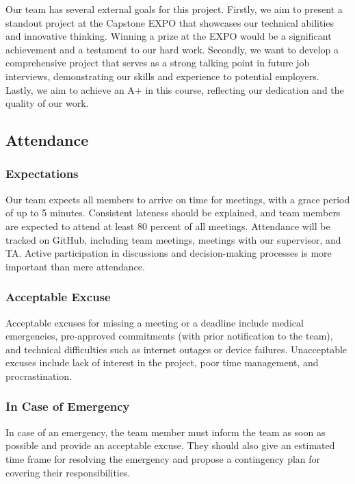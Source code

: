 \documentclass{article}
\begin{document}
Our team has several external goals for this project. Firstly, we aim to present a standout project at the Capstone EXPO that showcases our technical abilities and innovative thinking. Winning a prize at the EXPO would be a significant achievement and a testament to our hard work. Secondly, we want to develop a comprehensive project that serves as a strong talking point in future job interviews, demonstrating our skills and experience to potential employers. Lastly, we aim to achieve an A+ in this course, reflecting our dedication and the quality of our work.

\subsection*{Attendance}

\subsubsection*{Expectations}

Our team expects all members to arrive on time for meetings, with a grace period of up to 5 minutes. Consistent lateness should be explained, and team members are expected to attend at least 80 percent of all meetings. Attendance will be tracked on GitHub, including team meetings, meetings with our supervisor, and TA. Active participation in discussions and decision-making processes is more important than mere attendance.

\subsubsection*{Acceptable Excuse}

Acceptable excuses for missing a meeting or a deadline include medical emergencies, pre-approved commitments (with prior notification to the team), and technical difficulties such as internet outages or device failures. Unacceptable excuses include lack of interest in the project, poor time management, and procrastination.

\subsubsection*{In Case of Emergency}

In case of an emergency, the team member must inform the team as soon as possible and provide an acceptable excuse. They should also give an estimated time frame for resolving the emergency and propose a contingency plan for covering their responsibilities.
\end{document}
